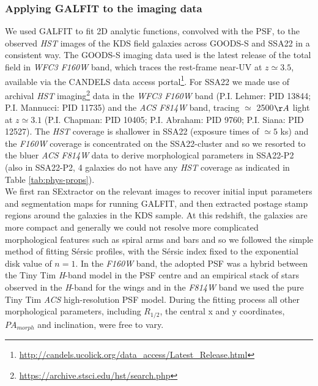 \documentclass[fleqn,usenatbib]{mnras}
\newcommand{\Sers}{S\'{e}rsic }
\begin{document}
\subsubsection{Applying {\scriptsize GALFIT} to the imaging data}\label{subsubsec:galfitting}
We used {\scriptsize GALFIT} \citep{Peng2010_galfit} to fit 2D analytic functions, convolved with the PSF, to the observed {\em HST} images of the KDS field galaxies across GOODS-S and SSA22 in a consistent way.
The GOODS-S imaging data used is the latest release of the total field in {\it WFC3 F160W} band, which traces the rest-frame near-UV at $z\simeq3.5$, available via the CANDELS \citep{Grogin2011,Koekemoer2011} data access portal\footnote{\url{http://candels.ucolick.org/data_access/Latest_Release.html}}.
For SSA22 we made use of archival {\em HST} imaging\footnote{\url{https://archive.stsci.edu/hst/search.php}} data in the {\it WFC3 F160W} band (P.I. Lehmer: PID 13844; P.I. Mannucci: PID 11735) and the {\it ACS F814W} band, tracing $\simeq$ 2500$\AA$ light at $z\simeq3.1$ (P.I. Chapman: PID 10405; P.I. Abraham: PID 9760; P.I. Siana: PID 12527).
The {\em HST} coverage is shallower in SSA22 (exposure times of $\simeq5$ ks) and the {\it F160W} coverage is concentrated on the SSA22-cluster and so we resorted to the bluer {\it ACS F814W} data to derive morphological parameters in SSA22-P2 (also in SSA22-P2, 4 galaxies do not have any {\em HST} coverage as indicated in Table \ref{tab:phys-props}). \\


We first ran SExtractor \citep{Bertin1996} on the relevant images to recover initial input parameters and segmentation maps for running {\scriptsize GALFIT}, and then extracted postage stamp regions around the galaxies in the KDS sample.
At this redshift, the galaxies are more compact and generally we could not resolve more complicated morphological features such as spiral arms and bars and so we followed the simple method of fitting \Sers profiles, with the \Sers index fixed to the exponential disk value of $n=1$.
In the {\it F160W} band, the adopted PSF was a hybrid between the Tiny Tim {\it H}-band model \citep{Krist2011} in the PSF centre and an empirical stack of stars observed in the {\it H}-band for the wings \citep{VanderWel2012} and in the {\it F814W} band we used the pure Tiny Tim {\it ACS} high-resolution PSF model.
During the fitting process all other morphological parameters, including $R_{1/2}$, the central x and y coordinates, $PA_{morph}$ and inclination, were free to vary.
\end{document}
